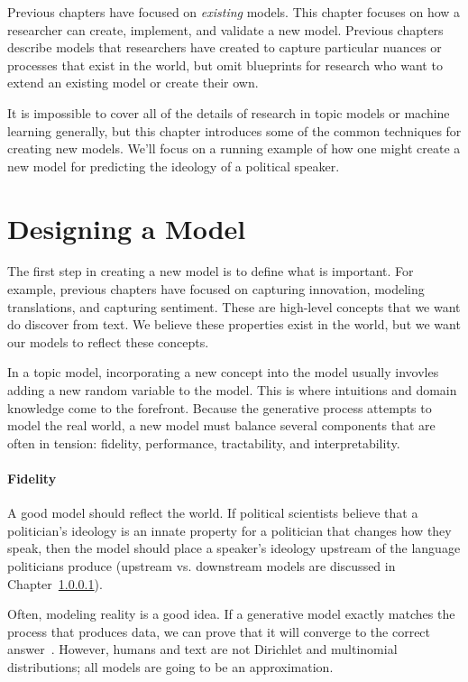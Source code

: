 
Previous chapters have focused on \emph{existing} models.  This
chapter focuses on how a researcher can create, implement, and
validate a new model.  Previous chapters describe
models that researchers have created to capture particular nuances or
processes that exist in the world, but omit blueprints
for research who want to extend an existing model or create their own.

It is impossible to cover all of the details of research in topic
models or machine learning generally, but this chapter introduces some
of the common techniques for creating new models.  We'll focus on a
running example of how one might create a new model for predicting the
ideology of a political speaker.

\section{Designing a Model}

The first step in creating a new model is to define what is
important.  For example, previous chapters have focused on capturing
innovation, modeling translations, and capturing sentiment.  These are
high-level concepts that we want do discover from text.  We believe
these properties exist in the world, but we want our models to reflect
these concepts.

In a topic model, incorporating a new concept into the model usually
invovles adding a new random variable to the model.  This is where
intuitions and domain knowledge come to the forefront.  Because the
generative process attempts to model the real world, a new model must
balance several components that are often in tension: fidelity,
performance, tractability, and interpretability.

\paragraph{Fidelity}

A good model should reflect the world.  If political scientists
believe that a politician's ideology is an innate property for a
politician that changes how they speak, then the model should place a
speaker's ideology upstream of the language politicians produce
(upstream vs. downstream models are discussed in Chapter~\ref{}).

Often, modeling reality is a good idea.  If a generative model exactly
matches the process that produces data, we can prove that it will
converge to the correct answer~\cite{}.  However, humans and text are
not Dirichlet and multinomial distributions; all models are going to
be an approximation.

